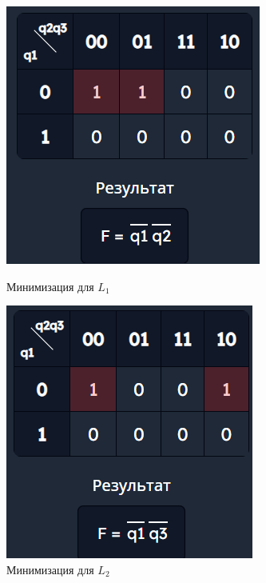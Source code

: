 \documentclass[11pt,a4paper,final]{article} %
\begin{document}
\begin{figure}[ht]
	\centering
	\begin{minipage}{0.45\textwidth}
		\centering
		\includegraphics[width=\linewidth]{img/L1.png}
		\caption{Минимизация для $L_1$}
		\label{fig:L1}
	\end{minipage}\hfill
	\begin{minipage}{0.45\textwidth}
		\centering
		\includegraphics[width=\linewidth]{img/L2.png}
		\caption{Минимизация для $L_2$}
		\label{fig:L2}
	\end{minipage}
\end{figure}
\end{document}
